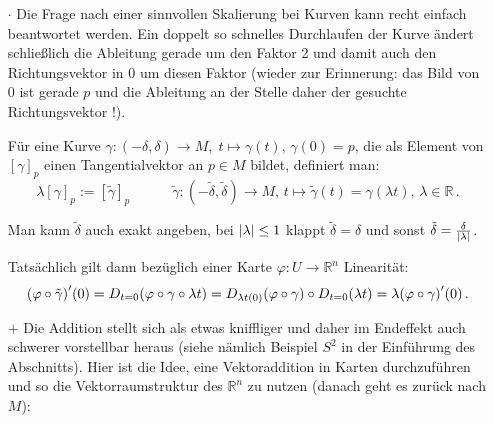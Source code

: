 \documentclass[../H_Analysis_main.tex]{subfiles}
\begin{document}
\begin{itemize}
\item[$\cdot$] Die Frage nach einer sinnvollen Skalierung bei Kurven kann recht einfach beantwortet werden. Ein doppelt so schnelles Durchlaufen der Kurve ändert schließlich die Ableitung gerade um den Faktor 2 und damit auch den Richtungsvektor in 0 um diesen Faktor (wieder zur Erinnerung: das Bild von 0 ist gerade $p$ und die Ableitung an der Stelle daher der gesuchte Richtungsvektor !).

\begin{defi}[Skalarmultiplikation]
Für eine Kurve $\gamma: (-\delta, \delta) \rightarrow M, \; t \mapsto \gamma(t), \, \gamma(0) = p$, die als Element von $[\gamma]_p$ einen Tangentialvektor an $p \in M$ bildet, definiert man:
\begin{equation}
\lambda [\gamma]_p := [\tilde{\gamma}]_p \qquad \quad \tilde{\gamma}: (-\tilde{\delta}, \tilde{\delta}) \rightarrow M, \, t \mapsto \tilde{\gamma}(t) = \gamma(\lambda t), \, \lambda \in \mathbb{R} \, .
\end{equation}

Man kann $\tilde{\delta}$ auch exakt angeben, bei $\abs{\lambda} \leq 1$ klappt $\tilde{\delta} = \delta$ und sonst $\tilde{\delta} = \frac{\delta}{\abs{\lambda}}$.
\end{defi}

Tatsächlich gilt dann bezüglich einer Karte $\varphi: U \rightarrow \mathbb{R}^n$ Linearität:
\begin{equation*}
\qty(\varphi \circ \tilde{\gamma})'(0) = D_{t = 0} \qty(\varphi \circ \gamma \circ \lambda t) = D_{\lambda t(0)}\qty(\varphi \circ \gamma) \circ D_{t = 0} \qty(\lambda t) = \lambda \qty(\varphi \circ \gamma)'(0) \, .
\end{equation*}



\item[$+$] Die Addition stellt sich als etwas kniffliger und daher im Endeffekt auch schwerer vorstellbar heraus (siehe nämlich Beispiel $S^2$ in der Einführung des Abschnitts). Hier ist die Idee, eine Vektoraddition in Karten durchzuführen und so die Vektorraumstruktur des $\mathbb{R}^n$ zu nutzen (danach geht es zurück nach $M$):


\end{itemize}
\end{document}
